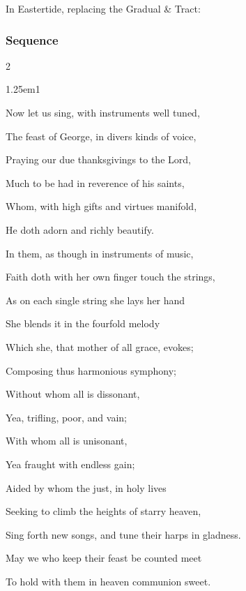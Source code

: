 
\begin{rubric}
{In Eastertide, replacing the Gradual \& Tract:}
\end{rubric}\par\noindent


\subsubsection{Sequence}
\begin{multicols}{2}
\begin{hangparas}{1.25em}{1}

Now let us sing, with instruments well tuned,

The feast of George, in divers kinds of voice,

Praying our due thanksgivings to the Lord,

Much to be had in reverence of his saints,

Whom, with high gifts and virtues manifold,

He doth adorn and richly beautify.

In them, as though in instruments of music,

Faith doth with her own finger touch the strings,


As on each single string she lays her hand

She blends it in the fourfold melody

Which she, that mother of all grace, evokes;

Composing thus harmonious symphony;

Without whom all is dissonant,

Yea, trifling, poor, and vain;

With whom all is unisonant,

Yea fraught with endless gain;

Aided by whom the just, in holy lives

Seeking to climb the heights of starry heaven,

Sing forth new songs, and tune their harps in gladness.

May we who keep their feast be counted meet

To hold with them in heaven communion sweet.
\end{hangparas}
\end{multicols}


